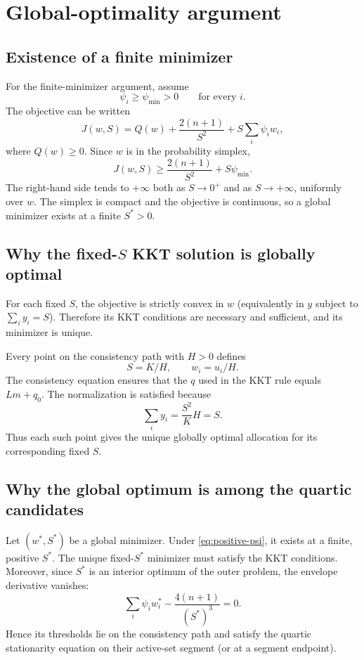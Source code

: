 \documentclass[11pt,a4paper]{article}
\newcommand{\1}{\mathbf{1}}
\begin{document}
\section{Global-optimality argument}

\subsection{Existence of a finite minimizer}

For the finite-minimizer argument, assume
\begin{equation}
  \psi_i\geq\psi_{\min}>0
  \qquad\text{for every }i.
  \label{eq:positive-psi}
\end{equation}
The objective can be written
\[
  J(w,S)=Q(w)+\frac{2(n+1)}{S^2}
       +S\sum_i\psi_iw_i,
\]
where \(Q(w)\geq0\). Since \(w\) is in the probability simplex,
\[
  J(w,S)\geq
  \frac{2(n+1)}{S^2}+S\psi_{\min}.
\]
The right-hand side tends to \(+\infty\) both as \(S\to0^+\) and
as \(S\to+\infty\), uniformly over \(w\). The simplex is compact
and the objective is continuous, so a global minimizer exists at a
finite \(S^*>0\).

\subsection{Why the fixed-\texorpdfstring{$S$}{S} KKT solution is globally optimal}

For each fixed \(S\), the objective is strictly convex in \(w\)
(equivalently in \(y\) subject to \(\sum_i y_i=S\)). Therefore its KKT
conditions are necessary and sufficient, and its minimizer is unique.

Every point on the consistency path with \(H>0\) defines
\[
  S=K/H,\qquad
  w_i=u_i/H.
\]
The consistency equation ensures that the \(q\) used in the KKT rule
equals \(Lm+q_0\). The normalization is satisfied because
\[
  \sum_i y_i
  =\frac{S^2}{K}H
  =S.
\]
Thus each such point gives the unique globally optimal allocation for
its corresponding fixed \(S\).

\subsection{Why the global optimum is among the quartic candidates}

Let \((w^*,S^*)\) be a global minimizer. Under
\eqref{eq:positive-psi}, it exists at a finite, positive \(S^*\).
The unique fixed-\(S^*\) minimizer must satisfy the KKT conditions.
Moreover, since \(S^*\) is an interior optimum of the outer problem,
the envelope derivative vanishes:
\[
  \sum_i\psi_iw_i^*-\frac{4(n+1)}{(S^*)^3}=0.
\]
Hence its thresholds lie on the consistency path and satisfy the
quartic stationarity equation on their active-set segment (or at a
segment endpoint).
\end{document}
